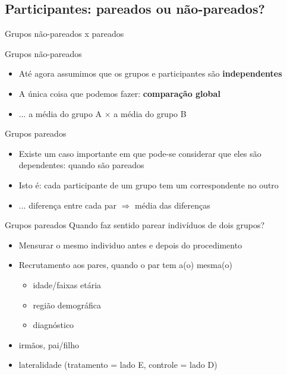 \documentclass{beamer}
\begin{document}
\subsection{Participantes: pareados ou não-pareados?}

\begin{frame}{Grupos não-pareados x pareados}
  \begin{block}{Grupos não-pareados}
    \begin{itemize}
    \item Até agora assumimos que os grupos e participantes são {\bf independentes}
    \item A única coisa que podemos fazer: {\bf comparação global}
    \item ... a média do grupo A $\times$ a média do grupo B
    \end{itemize}
  \end{block}
  \begin{block}{Grupos pareados}
    \begin{itemize}
    \item Existe um caso importante em que pode-se considerar que eles são dependentes: quando são pareados
    \item Isto é: cada participante de um grupo tem um correspondente no outro
    \item ... diferença entre cada par $\Rightarrow$ média das diferenças
    \end{itemize}
  \end{block}
\end{frame}

\begin{frame}{Grupos pareados}
Quando faz sentido parear indivíduos de dois grupos?
  \begin{itemize}
  \item Mensurar o \alert{mesmo} individuo antes e depois do procedimento
  \item Recrutamento aos pares, quando o par tem a(o) mesma(o)
    \begin{itemize}
    \item idade/faixas etária
    \item região demográfica
    \item diagnóstico
    \end{itemize}
  \item irmãos, pai/filho
  \item lateralidade (tratamento = lado E, controle = lado D)
  \end{itemize}
\end{frame}
\end{document}

